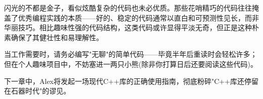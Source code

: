闪光的不都是金子，看似炫酷复杂的代码也未必优质。那些花哨精巧的代码往往掩盖了优秀编程实践的本质——好的、稳定的代码通常以直白和可预测性见长，而非华丽技巧。相比趣味性强的代码结构，这类代码或许显得平淡无奇，但正是这种朴素确保了其健壮性和易理解性。

当工作需要时，请务必编写"无聊"的简单代码——毕竟半年后重读时会轻松许多；但在个人趣味项目中，不妨塞进一两只小熊(除非你打算日后还要阅读这些代码)。

下一章中，Alex将发起一场现代C++库的正确使用指南，彻底粉碎"C++库还停留在石器时代"的谬见。